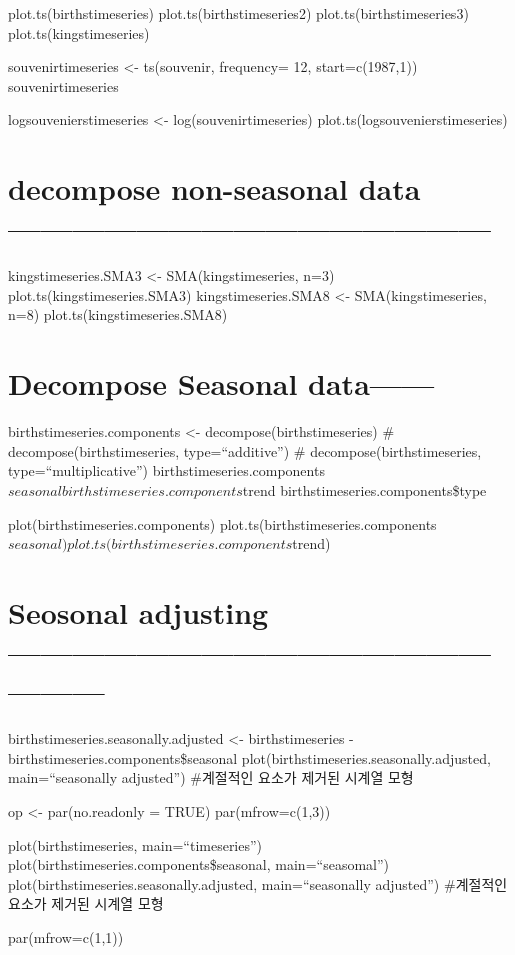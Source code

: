 \documentclass[]{article}
\begin{document}
plot.ts(birthstimeseries) plot.ts(birthstimeseries2)
plot.ts(birthstimeseries3) plot.ts(kingstimeseries)

souvenirtimeseries \textless{}- ts(souvenir, frequency= 12,
start=c(1987,1)) souvenirtimeseries

logsouvenierstimeseries \textless{}- log(souvenirtimeseries)
plot.ts(logsouvenierstimeseries)

\section{decompose non-seasonal data
---------------------------------------------}\label{decompose-non-seasonal-data}

kingstimeseries.SMA3 \textless{}- SMA(kingstimeseries, n=3)
plot.ts(kingstimeseries.SMA3) kingstimeseries.SMA8 \textless{}-
SMA(kingstimeseries, n=8) plot.ts(kingstimeseries.SMA8)

\section{Decompose Seasonal data------}\label{decompose-seasonal-data}

birthstimeseries.components \textless{}- decompose(birthstimeseries) \#
decompose(birthstimeseries, type=``additive'') \#
decompose(birthstimeseries, type=``multiplicative'')
birthstimeseries.components\(seasonal birthstimeseries.components\)trend
birthstimeseries.components\$type

plot(birthstimeseries.components)
plot.ts(birthstimeseries.components\(seasonal) plot.ts(birthstimeseries.components\)trend)

\section{Seosonal adjusting
------------------------------------------------------}\label{seosonal-adjusting}

birthstimeseries.seasonally.adjusted \textless{}- birthstimeseries -
birthstimeseries.components\$seasonal
plot(birthstimeseries.seasonally.adjusted, main=``seasonally adjusted'')
\#계절적인 요소가 제거된 시계열 모형

op \textless{}- par(no.readonly = TRUE) par(mfrow=c(1,3))

plot(birthstimeseries, main=``timeseries'')
plot(birthstimeseries.components\$seasonal, main=``seasomal'')
plot(birthstimeseries.seasonally.adjusted, main=``seasonally adjusted'')
\#계절적인 요소가 제거된 시계열 모형

par(mfrow=c(1,1))
\end{document}
